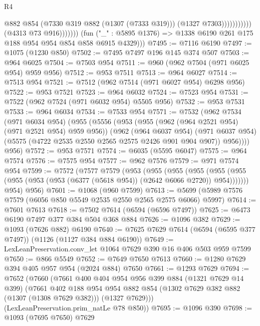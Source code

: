 \begin{lexlean}{R4}
\begin{coremodule}
                                        @882
                                        @854
                                        (@7330 @319 @882 (@1307 (@7333 @319)))
                                        (@1327 @7303)))))))))))
                    (@4313 @73 @916)))))))
        (fun ("_" : @5895 @1376) => @1338 @6190 @261 @175 @188 @954 @954 @854 @858 @6915 @4329)))
@7495 := @7116 @6190
@7497 := @1075 (@1230 @850)
@7502 := @7495 @7497 @196 @145 @374 @507
@7503 := @964 @6025
@7504 := @7503 @954
@7511 := @960 (@962 @7504 (@971 @6025 @954) @959 @956)
@7512 := @953 @7511
@7513 := @964 @6027
@7514 := @7513 @954
@7521 := @7512 (@962 @7514 (@971 @6027 @954) @6298 @956)
@7522 := @953 @7521
@7523 := @964 @6032
@7524 := @7523 @954
@7531 := @7522 (@962 @7524 (@971 @6032 @954) @5505 @956)
@7532 := @953 @7531
@7533 := @964 @6034
@7534 := @7533 @954
@7571 := @7532
    (@962
      @7534
      (@971 @6034 @954)
      (@955
        (@5556
          (@953
            (@955 (@962 (@964 @2521 @954) (@971 @2521 @954) @959 @956))
            (@962
              (@964 @6037 @954)
              (@971 @6037 @954)
              (@5575 (@4722 @2535 @2550 @2565 @2575 @2426 @901 @904 @907))
              @956))))
      @956)
@7572 := @953 @7571
@7574 := @6035 (@5595 @6047)
@7575 := @964 @7574
@7576 := @7575 @954
@7577 := @962 @7576
@7579 := @971 @7574 @954
@7599 := @7572
    (@7577
      @7579
      (@953
        (@955
          (@955
            (@955
              (@955 (@955 (@955 (@953 (@953 (@6377 (@5618 @954)) (@2642 @6066 @2720)) @954)))))))
        @954)
      @956)
@7601 := @1068 (@960 @7599)
@7613 := @5699 (@5989 @7576 @7579 (@6056 @850 @5549 @2535 @2550 @2565 @2575 @6066) @5997)
@7614 := @7601 @7613
@7618 := @7502 @7614 (@6594 (@6596 @7497))
@7625 := @6473 @6190 @7497 @377 @384 @504 @368 @884
@7626 := @1096 @382
@7629 := @1093 (@7626 @882) @6190
@7640 := @7625 @7629 @7614 (@6594 (@6595 @377 @7497)) (@1126 (@1127 @384 @884 @6190))
@7649 := LexLeanPreservation.conv_let @1064 @7629 @390 @16 @406 @503 @959 @7599
@7650 := @866 @5549
@7652 := @7649 @7650 @7613
@7660 := @1280 @7629 @394 @405 @957 @954 (@2024 @884) @7650
@7661 := @1293 @7629
@7694 := @7652
    (@7660
      (@7661
        @400
        @404
        @954
        @956
        @399
        @884
        (@1321 @7629 @14 @399)
        (@7661
          @402
          @188
          @954
          @954
          @882
          @854
          (@1302 @7629 @382 @882 (@1307 (@1308 @7629 @382)))
          (@1327 @7629)))
      (LexLeanPreservation.prim_natLe @78 @850))
@7695 := @1096 @390
@7698 := @1093 (@7695 @7650) @7629

\end{coremodule}
\end{lexlean}
